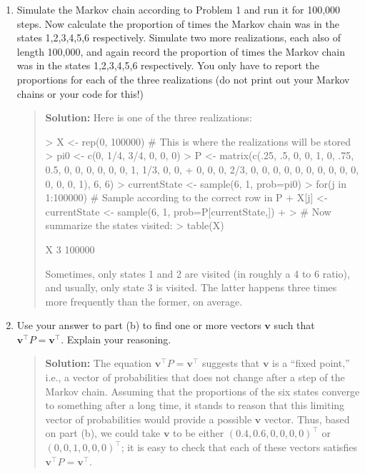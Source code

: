 \documentclass{article}
\begin{document}
\begin{enumerate}
\begin{enumerate}
    \item Simulate the Markov chain according to Problem 1 and run it for
    100,000 steps. Now calculate the proportion of times the Markov chain was in
    the states 1,2,3,4,5,6 respectively. Simulate two more realizations, each
    also of length 100,000, and again record the proportion of times the Markov
    chain was in the states 1,2,3,4,5,6 respectively. You only have to report
    the proportions for each of the three realizations (do not print out your
    Markov chains or your code for this!)
    \begin{quotation}{\bf Solution:}
    Here is one of the three realizations:
\begin{Schunk}
\begin{Sinput}
> X <- rep(0, 100000) # This is where the realizations will be stored
> pi0 <- c(0, 1/4, 3/4, 0, 0, 0)
> P <- matrix(c(.25, .5, 0, 0, 1, 0, .75, 0.5, 0, 0, 0, 0, 0, 0, 1, 1/3, 0, 0,
+             0, 0, 0, 2/3, 0, 0, 0, 0, 0, 0, 0, 0, 0, 0, 0, 0, 0, 1), 6, 6)
> currentState <- sample(6, 1, prob=pi0)
> for(j in 1:100000) { # Sample according to the correct row in P
+   X[j] <- currentState <- sample(6, 1, prob=P[currentState,])
+ }
> # Now summarize the states visited:
> table(X)
\end{Sinput}
\begin{Soutput}
X
     3 
100000 
\end{Soutput}
\end{Schunk}
    Sometimes, only states 1 and 2 are visited (in roughly a 4 to 6 ratio), and 
    usually, only state 3 is visited.  The latter happens three times more frequently
    than the former, on average.
    \end{quotation}

    \item Use your answer to part (b) to find one or more vectors $\bm v$ such
    that $\bm v^\top P=\bm v^\top$. Explain your reasoning.
    \begin{quotation}{\bf Solution:}
    The equation $\bm v^\top P=\bm v^\top$ suggests that $\bm v$ is a ``fixed point,''
    i.e., a vector of probabilities that does not change after a step of the Markov chain.
    Assuming that the proportions of the six states converge to something after a long
    time, it stands to reason that this limiting vector of probabilities would provide a
    possible $\bm v$ vector.  Thus, based on part (b), we could take $\bm v$ to be
    either $(0.4, 0.6, 0, 0, 0, 0)^\top$ or $(0, 0, 1, 0, 0, 0)^\top$; it is easy to check that
    each of these vectors satisfies $\bm v^\top P=\bm v^\top$.
    \end{quotation}

    \end{enumerate}

\end{enumerate}
\end{document}
